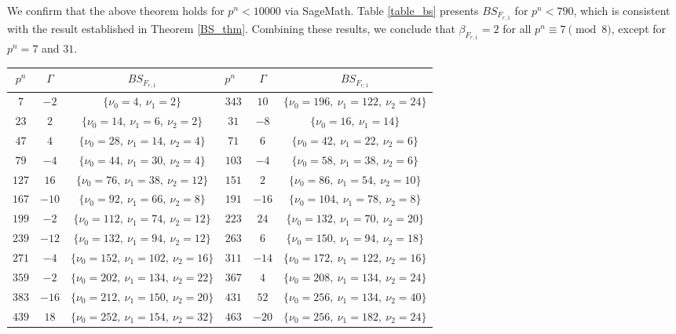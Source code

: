 \documentclass[11pt]{article}
\numberwithin{theorem}{section}
\begin{document}
We confirm that the above theorem holds for $p^n < 10000$ via SageMath.  Table \ref{table_bs} presents $BS_{F_{r,1}}$ for $p^n < 790$, which is consistent with the result established in Theorem \ref{BS_thm}. Combining these results, we conclude that $\beta_{F_{r,1}}=2$ for all $p^n\equiv 7\pmod{8}$, except for $p^n = 7$ and $31$.



\begin{table}
	\begin{center}
		\begin{tabular}{ccc|ccc}
			\hline $p^n$ & $\Gamma$ & $BS_{F_{r,1}}$ &  $p^n$\ & $\Gamma$ & $BS_{F_{r,1}}$ \\
			\hline $7$ & $-2$ & $\{ \nu_0 = 4,\ \nu_1 = 2 \}$ & $343$ & $10$ & $\{\nu_0 = 196,\ \nu_1 = 122,\ \nu_2 = 24 \}$\\
			$23$ &  $2$ & $\{ \nu_0 = 14,\ \nu_1 = 6,\ \nu_2 = 2 \}$ & $31$ & $-8$ & $\{\nu_0 = 16,\ \nu_1 = 14 \}$\\
			$47$ & $4$ & $\{ \nu_0 = 28,\ \nu_1 = 14,\ \nu_2 = 4 \}$ & $71$ & $6$ & $\{\nu_0 = 42,\ \nu_1 = 22,\ \nu_2 = 6 \}$\\
			$79$ & $-4$ & $\{ \nu_0 = 44,\ \nu_1 = 30,\ \nu_2 = 4 \}$ & $103$ & $-4$ &  $\{\nu_0 = 58,\ \nu_1 = 38,\ \nu_2 = 6 \}$\\
			$127$ & $16$ &  $\{ \nu_0 = 76,\ \nu_1 = 38,\ \nu_2 = 12 \}$ & $151$ & $2$ &  $\{ \nu_0 = 86,\ \nu_1 = 54,\ \nu_2 = 10 \}$\\
			$167$ & $-10$ &  $\{ \nu_0 = 92,\ \nu_1 = 66,\ \nu_2 = 8 \}$ & $191$ & $-16$ &  $\{ \nu_0 = 104,\ \nu_1 = 78,\ \nu_2 = 8 \}$\\
			$199$ & $-2$ &  $\{ \nu_0 = 112,\ \nu_1 = 74,\ \nu_2 = 12 \}$ & $223$ & $24$ &  $\{ \nu_0 = 132,\ \nu_1 = 70,\ \nu_2 = 20 \}$\\
			$239$ & $-12$ &  $\{ \nu_0 = 132,\ \nu_1 = 94,\ \nu_2 = 12 \}$ & $263$ & $6$ &  $\{ \nu_0 = 150,\ \nu_1 = 94,\ \nu_2 = 18 \}$\\
			$271$ & $-4$ &  $\{ \nu_0 = 152,\ \nu_1 = 102,\ \nu_2 = 16 \}$ & $311$ & $-14$ &  $\{ \nu_0 = 172,\ \nu_1 = 122,\ \nu_2 = 16 \}$\\
			$359$ & $-2$ &  $\{ \nu_0 = 202,\ \nu_1 = 134,\ \nu_2 = 22 \}$ & $367$ & $4$ &  $\{ \nu_0 = 208,\ \nu_1 = 134,\ \nu_2 = 24 \}$\\
			$383$ & $-16$ &  $\{ \nu_0 = 212,\ \nu_1 = 150,\ \nu_2 = 20 \}$ & $431$ & $52$ &  $\{ \nu_0 = 256,\ \nu_1 = 134,\ \nu_2 = 40 \}$\\
			$439$ & $18$ &  $\{ \nu_0 = 252,\ \nu_1 = 154,\ \nu_2 = 32 \}$ & $463$ & $-20$ &  $\{ \nu_0 = 256,\ \nu_1 = 182,\ \nu_2 = 24 \}$\\

\end{tabular}
\end{center}
\end{table}
\end{document}
